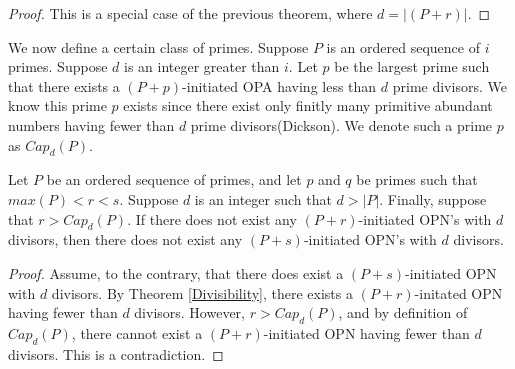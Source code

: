\documentclass[../paper.tex]{subfiles}
\begin{document}
\begin{proof}
This is a special case of the previous theorem, where $d = |(P + r)|$.
\end{proof}

We now define a certain class of primes.
Suppose $P$ is an ordered sequence of $i$ primes. Suppose $d$ is
an integer greater than $i$. Let $p$ be the largest prime such 
that there exists a $(P + p)$-initiated OPA having less than $d$ 
prime divisors. We know this prime $p$ exists since 
there exist only finitly many primitive abundant numbers having
fewer than $d$ prime divisors(Dickson). We denote such a prime $p$
as $Cap_d(P)$. 

\begin{theorem}
Let $P$ be an ordered sequence of primes, and  let $p$ and $q$ be 
primes such that $max(P) < r < s$. Suppose $d$ is an integer such
that $d > |P|$. Finally, suppose that $r > Cap_d(P)$. If there
does not exist any $(P + r)$-initiated OPN's with $d$ divisors,
then there does not exist any $(P + s)$-initiated OPN's with $d$ 
divisors.
\end{theorem}

\begin{proof}
Assume, to the contrary, that there does exist a $(P + 
s)$-initiated OPN with $d$ divisors. By Theorem {\ref{Divisibility}},
there exists a $(P + r)$-initated OPN having fewer than $d$
divisors. However, $r > Cap_d(P)$, and by definition of
$Cap_d(P)$, there cannot exist a $(P + r)$-initiated OPN having
fewer than $d$ divisors. This is a contradiction.
\end{proof}
\end{document}
